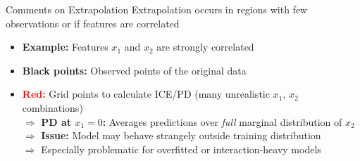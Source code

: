 \documentclass[11pt,compress,t,notes=noshow, aspectratio=169, xcolor=table]{beamer}
\begin{document}
\begin{frame}{Comments on Extrapolation}
Extrapolation occurs in regions with few observations or if features are correlated
\begin{itemize}
\item \textbf{Example:} Features $x_1$ and $x_2$ are strongly correlated
\item \textbf{Black points:} Observed points of the original data
\item \textbf{\textcolor{red}{Red:}} Grid points to calculate ICE/PD (many unrealistic $x_1$, $x_2$ combinations)\\ %
$\Rightarrow$ %
\textbf{PD at $x_1=0$:} Averages predictions over \textit{full} marginal distribution of $x_2$\\
$\Rightarrow$ \textbf{Issue:} Model may behave strangely outside training distribution\\
$\Rightarrow$ Especially problematic for overfitted or interaction-heavy models 
\end{itemize}

%
%
%
%
\end{frame}
\end{document}
